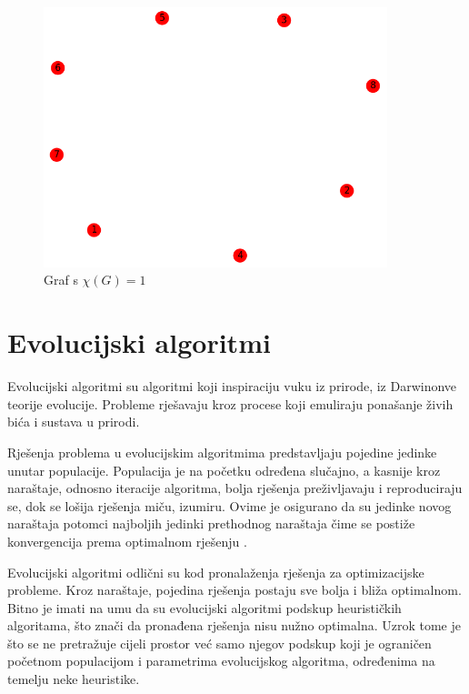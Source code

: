 \documentclass[times, utf8, zavrsni, numeric]{fer}
\begin{document}
\begin{figure}[htb]
\centering
\includegraphics[width=10cm]{images/8_vertices_nepovezane.png}
\caption{Graf s $\chi(G)=1$}
\label{fig:graf s kromatskim brojem 1}
\end{figure}

\chapter{Evolucijski algoritmi}

Evolucijski algoritmi su algoritmi koji inspiraciju vuku iz prirode, iz Darwinonve teorije evolucije. Probleme rješavaju kroz procese koji emuliraju ponašanje živih bića i sustava u prirodi.

Rješenja problema u evolucijskim algoritmima predstavljaju pojedine jedinke unutar populacije. Populacija je na početku određena slučajno, a kasnije kroz naraštaje, odnosno iteracije algoritma, bolja rješenja preživljavaju i reproduciraju se, dok se lošija rješenja miču, izumiru. Ovime je osigurano da su jedinke novog naraštaja potomci najboljih jedinki prethodnog naraštaja čime se postiže konvergencija prema optimalnom rješenju \cite{cupic2010prirodom}.

Evolucijski algoritmi odlični su kod pronalaženja rješenja za optimizacijske probleme. Kroz naraštaje, pojedina rješenja postaju sve bolja i bliža optimalnom. Bitno je imati na umu da su evolucijski algoritmi podskup heurističkih algoritama, što znači da pronađena rješenja nisu nužno optimalna. Uzrok tome je što se ne pretražuje cijeli prostor već samo njegov podskup koji je ograničen početnom populacijom i parametrima evolucijskog algoritma, određenima na temelju neke heuristike.
\end{document}
